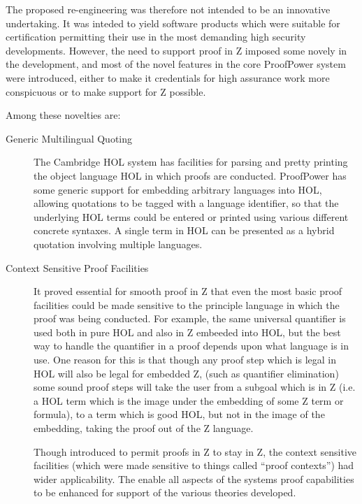 \documentclass{rbjk}
\begin{document}
\begin{article}
The proposed re-engineering was therefore not intended to be an
innovative undertaking.
It was inteded to yield software products which were suitable for
certification permitting their use in the most demanding high security
developments.
However, the need to support proof in Z imposed some novely in the
development, and most of the novel features in the core ProofPower
system were introduced, either to make it credentials for high
assurance work more conspicuous or to make support for Z possible.

Among these novelties are:

\begin{description}
\item[Generic Multilingual Quoting]
The Cambridge HOL system has facilities for parsing and pretty
printing the object language HOL in which proofs are conducted.
ProofPower has some generic support for embedding arbitrary languages
into HOL, allowing quotations to be tagged with a language identifier,
so that the underlying HOL terms could be entered or printed using
various different concrete syntaxes.
A single term in HOL can be presented as a hybrid quotation involving
multiple languages.
\item[Context Sensitive Proof Facilities]
It proved essential for smooth proof in Z that even the most basic
proof facilities could be made sensitive to the principle language in
which the proof was being conducted.
For example, the same universal quantifier is used both in pure HOL
and also in Z embeeded into HOL, but the best way to handle the
quantifier in a proof depends upon what language is in use.
One reason for this is that though any proof step which is legal in
HOL will also be legal for embedded Z, (such as quantifier
elimination) some sound proof steps will take the user from a subgoal
which is in Z (i.e. a HOL term which is the image under the embedding
of some Z term or formula), to a term which is good HOL, but not in
the image of the embedding, taking the proof out of the Z language.

Though introduced to permit proofs in Z to stay in Z, the context
sensitive facilities (which were made sensitive to things called
``proof contexts'') had wider applicability.
The enable all aspects of the systems proof capabilities to be
enhanced for support of the various theories developed.


\end{description}


{\raggedright


} %


\end{article}
\end{document}
